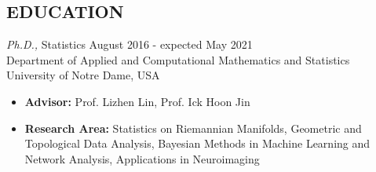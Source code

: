\documentclass[margin, 10pt]{res} %
\begin{document}
\begin{resume}

% 

%
%

\section{\sf EDUCATION}

{\sl Ph.D.,} Statistics  \hfill August 2016 - expected May 2021\\
Department of Applied and Computational Mathematics and Statistics\\ University of Notre Dame, USA
\begin{itemize} \itemsep -1.0pt %
\item {\bf Advisor:} Prof. Lizhen Lin, Prof. Ick Hoon Jin
\item {\bf Research Area:} Statistics on Riemannian Manifolds, Geometric and Topological Data Analysis, Bayesian Methods in Machine Learning and Network Analysis, Applications in Neuroimaging 
\end{itemize}


\end{resume}
\end{document}
